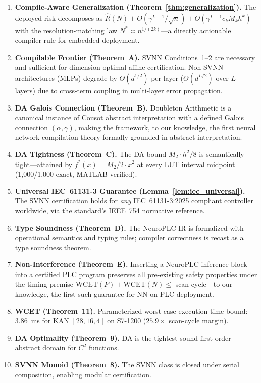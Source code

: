 \documentclass[journal,onecolumn]{IEEEtran}
\begin{document}
\begin{enumerate}[label=\arabic*.]
    \item \textbf{Compile-Aware Generalization
   (Theorem~\ref{thm:generalization}).} The deployed risk decomposes as
   $\hat{R}(N) + O(\gamma^{L-1}/\sqrt{n}) + O(\gamma^{L-1}c_kM_kh^k)$
   with the resolution-matching law $N^{*} \asymp n^{1/(2k)}$---a
   directly actionable compiler rule for embedded deployment.

    \item \textbf{Compilable Frontier (Theorem~A).} SVNN Conditions~1--2 are
   necessary and sufficient for dimension-optimal affine certification.
   Non-SVNN architectures (MLPs) degrade by $\Theta(d^{1/2})$ per layer
   ($\Theta(d^{L/2})$ over $L$ layers) due to cross-term coupling in
   multi-layer error propagation.

    \item \textbf{DA Galois Connection (Theorem~B).} Doubleton Arithmetic is a
   canonical instance of Cousot abstract interpretation with a defined Galois
   connection $(\alpha, \gamma)$, making the framework, to our knowledge, the first neural
   network compilation theory formally grounded in abstract interpretation.

    \item \textbf{DA Tightness (Theorem~C).} The DA bound $M_2 \cdot h^2 / 8$ is
   semantically tight---attained by $f^*(x) = M_2/2 \cdot x^2$ at every LUT
   interval midpoint (1{,}000/1{,}000 exact, MATLAB-verified).

    \item \textbf{Universal IEC~61131-3 Guarantee (Lemma~\ref{lem:iec_universal}).}
   The SVNN certification holds for \textit{any} IEC~61131-3:2025 compliant
   controller worldwide, via the standard's IEEE~754 normative reference.

    \item \textbf{Type Soundness (Theorem~D).} The NeuroPLC IR is formalized with
   operational semantics and typing rules; compiler correctness is recast as a
   type soundness theorem.

    \item \textbf{Non-Interference (Theorem~E).} Inserting a NeuroPLC inference
   block into a certified PLC program preserves all pre-existing safety
   properties under the timing premise $\text{WCET}(P) + \text{WCET}(N)
   \leq$ scan cycle---to our knowledge, the first such guarantee for
   NN-on-PLC deployment.

    \item \textbf{WCET (Theorem~11).} Parameterized worst-case execution time
   bound: $3.86$~ms for KAN $[28,16,4]$ on S7-1200 ($25.9\times$ scan-cycle
   margin).

    \item \textbf{DA Optimality (Theorem~9).} DA is the tightest sound
   first-order abstract domain for $C^2$ functions.

    \item \textbf{SVNN Monoid (Theorem~8).} The SVNN class is closed under
   serial composition, enabling modular certification.
\end{enumerate}
\end{document}
